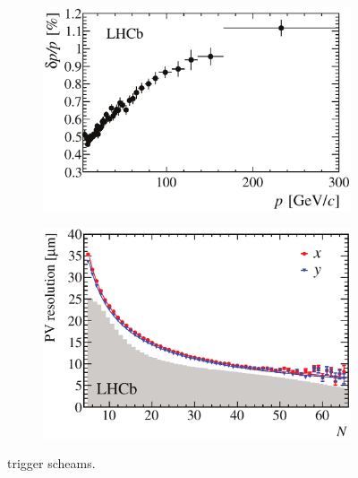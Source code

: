 \begin{figure}[t]
  \centering
  \begin{subfigure}{0.5\textwidth}
    \raggedright
    \includegraphics[width=\textwidth]{Figures/Chapter2/dppVsp-crop-cmyk}
    \caption{}
    \label{det_deltappvp}
  \end{subfigure}%
  \begin{subfigure}{0.5\textwidth}
    \raggedleft
    \includegraphics[width=\textwidth]{Figures/Chapter2/DataResXY_1PV_2012-crop-cmyk.pdf}
    \caption{}
    \label{det_velo_pv_res}
  \end{subfigure}
  \caption{ trigger scheams.}
  \label{det_velo_perf}
\end{figure}

